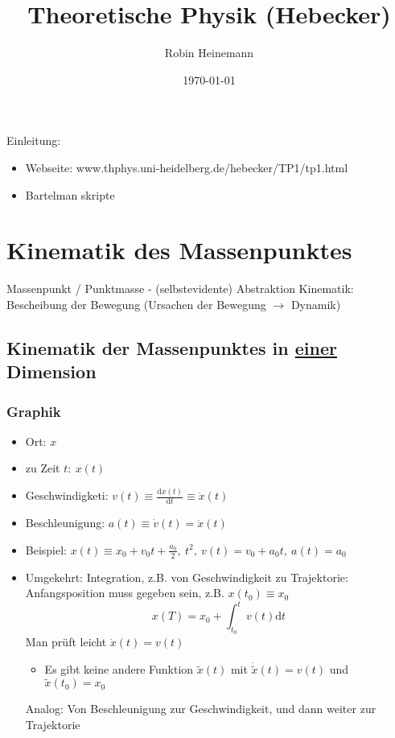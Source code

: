 \documentclass[11pt]{article}
\author{Robin Heinemann}
\date{\today}
\title{Theoretische Physik (Hebecker)}
\begin{document}
\maketitle
\tableofcontents

Einleitung: \\
\begin{itemize}
\item Webseite: www.thphys.uni-heidelberg.de/hebecker/TP1/tp1.html
\item Bartelman skripte
\end{itemize}

\section{Kinematik des Massenpunktes}
\label{sec-1}
Massenpunkt / Punktmasse - (selbstevidente) Abstraktion
Kinematik: Bescheibung der Bewegung (Ursachen der Bewegung $\rightarrow$ Dynamik)
\subsection{Kinematik der Massenpunktes in \underline{einer} Dimension}
\label{sec-1-1}
\subsubsection{Graphik}
\label{sec-1-1-1}
\begin{itemize}
\item Ort: $x$
\item zu Zeit $t:~x(t)$
\item Geschwindigketi: $v(t) \equiv \frac{\mathrm{d}x(t)}{\mathrm{d}t} \equiv \dot{x}(t)$
\item Beschleunigung: $a(t) \equiv \dot{v}(t) = \ddot{x}(t)$
\item Beispiel: $x(t) \equiv x_0 + v_0 t + \frac{a_0}{2},~t^2,~v(t) = v_0 + a_0 t,~a(t) = a_0$
\item Umgekehrt: Integration, z.B. von Geschwindigkeit zu Trajektorie: Anfangsposition muss gegeben sein, z.B. $x(t_0) \equiv x_0$
     \[x(T)=x_0 + \int_{t_0}^{t}v(t)\mathrm{d}t\]
     Man prüft leicht $\dot{x}(t) = v(t)$
\begin{itemize}
\item Es gibt keine andere Funktion $\tilde{x}(t)$ mit $\dot{\tilde{x}}(t) = v(t)$ und $\tilde{x}(t_0) = x_0$
\end{itemize}
Analog: Von Beschleunigung zur Geschwindigkeit, und dann weiter zur Trajektorie
\end{itemize}
\end{document}
